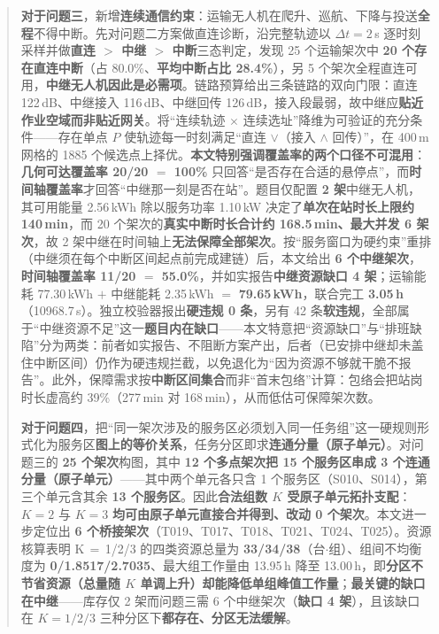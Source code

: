 \begin{abstract}
	\textbf{对于问题三}，新增\textbf{连续通信约束}：运输无人机在爬升、巡航、下降与投送\textbf{全程}不得中断。先对问题二方案做直连诊断，沿完整轨迹以 $\Delta t=2$\,s 逐时刻采样并做\textbf{直连 $>$ 中继 $>$ 中断}三态判定，发现 25 个运输架次中 \textbf{20 个存在直连中断}（占 80.0\%、\textbf{平均中断占比 28.4\%}），另 5 个架次全程直连可用，\textbf{中继无人机因此是必需项}。链路预算给出三条链路的双向门限：直连 122\,dB、中继接入 116\,dB、中继回传 126\,dB，接入段最弱，故中继应\textbf{贴近作业空域而非贴近网关}。将“连续轨迹 $\times$ 连续选址”降维为可验证的充分条件——存在单点 $P$ 使轨迹每一时刻满足“直连 $\vee$（接入 $\wedge$ 回传）”，在 400\,m 网格的 1885 个候选点上择优。\textbf{本文特别强调覆盖率的两个口径不可混用}：\textbf{几何可达覆盖率 20/20 $=$ 100\%} 只回答“是否存在合适的悬停点”，而\textbf{时间轴覆盖率}才回答“中继那一刻是否在站”。题目仅配置 \textbf{2 架}中继无人机，其可用能量 2.56\,kWh 除以服务功率 1.10\,kW 决定了\textbf{单次在站时长上限约 140\,min}，而 20 个架次的\textbf{真实中断时长合计约 168.5\,min、最大并发 6 架次}，故 2 架中继在时间轴上\textbf{无法保障全部架次}。按“服务窗口为硬约束”重排（中继须在每个中断区间起点前完成建链）后，本文给出 \textbf{6 个中继架次}，\textbf{时间轴覆盖率 11/20 $=$ 55.0\%}，并如实报告\textbf{中继资源缺口 4 架}；运输能耗 77.30\,kWh $+$ 中继能耗 2.35\,kWh $=$ \textbf{79.65\,kWh}，联合完工 \textbf{3.05\,h}（10968.7\,s）。独立校验器报出\textbf{硬违规 0 条}，另有 42 条\textbf{软违规}，全部属于“中继资源不足”这一\textbf{题目内在缺口}——本文特意把“资源缺口”与“排班缺陷”分为两类：前者如实报告、不阻断方案产出，后者（已安排中继却未盖住中断区间）仍作为硬违规拦截，以免退化为“因为资源不够就干脆不报告”。此外，保障需求按\textbf{中断区间集合}而非“首末包络”计算：包络会把站岗时长虚高约 39\%（277\,min 对 168\,min），从而低估可保障架次数。

	\textbf{对于问题四}，把“同一架次涉及的服务区必须划入同一任务组”这一硬规则形式化为服务区\textbf{图上的等价关系}，任务分区即求\textbf{连通分量（原子单元）}。对问题三的 \textbf{25 个架次}构图，其中 \textbf{12 个多点架次把 15 个服务区串成 3 个连通分量（原子单元）}——其中两个单元各只含 1 个服务区（S010、S014），第三个单元含其余 \textbf{13 个服务区}。因此\textbf{合法组数 $K$ 受原子单元拓扑支配}：$K=2$ 与 $K=3$ \textbf{均可由原子单元直接合并得到、改动 0 个架次}。本文进一步定位出 \textbf{6 个桥接架次}（T019、T017、T018、T021、T024、T025）。资源核算表明 K$\,=\,$1/2/3 的四类资源总量为 \textbf{33/34/38}（台$\cdot$组）、组间不均衡度为 \textbf{0/1.8517/2.7035}、最大组工作量由 13.95\,h 降至 13.00\,h，即\textbf{分区不节省资源（总量随 $K$ 单调上升）却能降低单组峰值工作量}；\textbf{最关键的缺口在中继}——库存仅 2 架而问题三需 6 个中继架次（\textbf{缺口 4 架}），且该缺口在 $K=1/2/3$ 三种分区下\textbf{都存在、分区无法缓解}。


\end{abstract}

